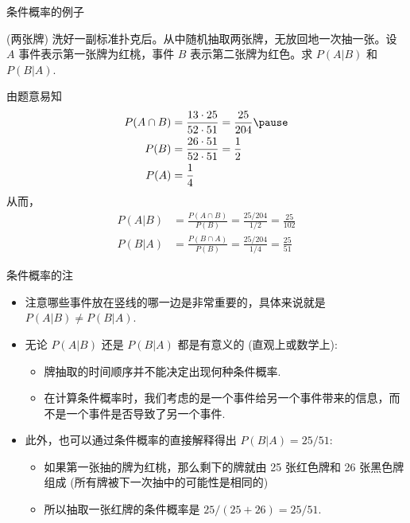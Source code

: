 \begin{frame}{条件概率的例子}
\begin{exam}
	(两张牌) 洗好一副标准扑克后。从中随机抽取两张牌，无放回地一次抽一张。设 $A$ 事件表示第一张牌为红桃，事件 $B$ 表示第二张牌为红色。求 $P ( A | B )$ 和 $P ( B | A )$.
\end{exam}

\begin{jieda}
  由题意易知
  \begin{align*}
	P(A\cap B) &=\frac{13 \cdot 25}{52 \cdot 51}=\frac{25}{204}\pause \\
	P(B)&=\frac{26 \cdot 51}{52 \cdot 51}=\frac{1}{2} \\
	P(A) &=\frac{1}{4}
  \end{align*}
  \pause
  从而，
  \begin{align*}
	P(A|B) &=\frac{P(A\cap B)}{P(B)}=\frac{25/204}{1/2}=\frac{25}{102}\\
	P(B|A) &=\frac{P(B \cap A)}{P(B)}=\frac{25/204}{1/4}=\frac{25}{51}
  \end{align*}



\end{jieda}

\end{frame}
\begin{frame}{条件概率的注}
\begin{itemize}[<+-|alert@+>]
\item  注意哪些事件放在竖线的哪一边是非常重要的，具体来说就是 $P (A|B)\neq P (B|A)$.
\item 无论 $P (A|B)$ 还是 $P (B|A)$ 都是有意义的 (直观上或数学上):
\begin{itemize}[<+-|alert@+>]
   \item 牌抽取的时间顺序并不能决定出现何种条件概率.
   \item 在计算条件概率时，我们考虑的是一个事件给另一个事件带来的信息，而不是一个事件是否导致了另一个事件.
\end{itemize}

\item  此外，也可以通过条件概率的直接解释得出 $P (B|A)=25/51$:
\begin{itemize}[<+-|alert@+>]
	\item 如果第一张抽的牌为红桃，那么剩下的牌就由 25 张红色牌和 26 张黑色牌组成 (所有牌被下一次抽中的可能性是相同的)
	\item 所以抽取一张红牌的条件概率是 $25/(25+26)=25/51$.
\end{itemize}
\end{itemize}

\end{frame}

